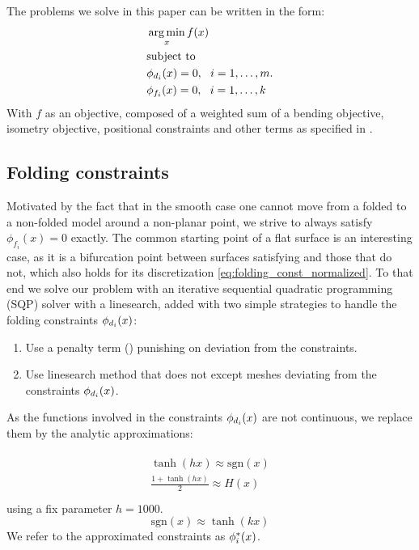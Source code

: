 The problems we solve in this paper can be written in the form:
\begin{equation} \label{eq:const_opt}
\begin{aligned}
& \operatorname*{arg\,min}_x f(x) \\
& \textrm{subject to} \\
& \phi_{d_i}(x) = 0, \ \  i = 1, \ldots, m. \\
& \phi_{f_i}(x) = 0, \ \  i = 1, \ldots, k \\ 
\end{aligned}
\end{equation}
With $f$ as an objective, composed of a weighted sum of a bending objective, isometry objective, positional constraints and other terms as specified in .

\subsection{Folding constraints}
Motivated by the fact that in the smooth case one cannot move from a folded to a non-folded model around a non-planar point, we strive to always satisfy $\phi_{f_i}(x) = 0$ exactly. The common starting point of a flat surface is an interesting case, as it is a bifurcation point between surfaces satisfying  and those that do not, which also holds for its discretization \eqref{eq:folding_const_normalized}. To that end we solve our problem with an iterative sequential quadratic programming (SQP) solver with a linesearch, added with two simple strategies to handle the folding constraints $\phi_{d_i}(x)$:
\begin{enumerate}
	\item Use a penalty term (\cite{nocedal}) punishing on deviation from the constraints. \label{opt:penalty}
	\item Use linesearch method that does not except meshes deviating from the constraints $\phi_{d_i}(x)$.
\end{enumerate}
As the functions involved in the constraints $\phi_{d_i}(x)$ are not continuous, we replace them by the analytic approximations:

\begin{align} 
\begin{split}\label{eq:const_inner}
\tanh(hx) \approx \text{sgn}(x) \\
\frac{1+\tanh(hx)}{2} \approx H(x)\\
\end{split}
\end{align}
using a fix parameter $h=1000$.
\begin{equation}
\text{sgn}(x) \approx \tanh(kx)
\end{equation}
We refer to the approximated constraints as $\phi^*_i(x)$.

